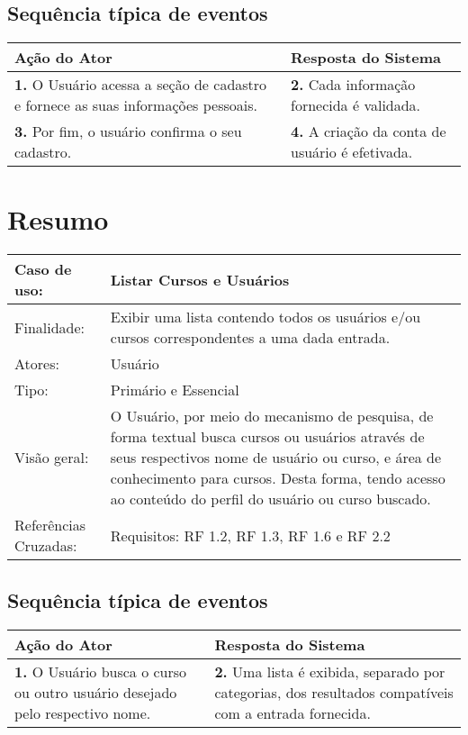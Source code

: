 \documentclass[12pt,a4paper,onecolumn,titlepage]{article}
\begin{document}
\subsection{Sequência típica de eventos}
\begin{center}
\def\arraystretch{1.1}
\begin{tabular}{|p{6cm}|p{6cm}|}

\hline
\textbf{Ação do Ator} & \textbf{Resposta do Sistema} \\ \hline
\textbf{1.} O Usuário acessa a seção de cadastro e fornece as suas informações pessoais. & \textbf{2.} Cada informação fornecida é validada. \\ \hline
\textbf{3.} Por fim, o usuário confirma o seu cadastro. & \textbf{4.} A criação da conta de usuário é efetivada. \\ \hline
\end{tabular}
\end{center}


\newpage

\section{Resumo}
\begin{table}[h!]
\begin{center}
\begin{tabular}{p{2.5cm} p{9.5cm}}
Caso de uso: & \textbf{Listar Cursos e Usuários} \\ \hline
Finalidade: & Exibir uma lista contendo todos os usuários e/ou cursos correspondentes a uma dada entrada.\\ \hline
Atores: & Usuário \\ \hline
Tipo: & Primário e Essencial\\ \hline
Visão geral: & O Usuário, por meio do mecanismo de pesquisa, de forma textual busca cursos ou usuários através de seus respectivos nome de usuário ou curso, e área de conhecimento para cursos. Desta forma, tendo acesso ao conteúdo do perfil do usuário ou curso buscado.\\ \hline
Referências Cruzadas: & Requisitos: RF 1.2, RF 1.3, RF 1.6 e RF 2.2

\end{tabular}
\end{center}
\end{table}

\subsection{Sequência típica de eventos}
\begin{center}
\def\arraystretch{1.1}
\begin{tabular}{|p{6cm}|p{6cm}|}

\hline
\textbf{Ação do Ator} & \textbf{Resposta do Sistema} \\ \hline
\textbf{1.} O Usuário busca o curso ou outro usuário desejado pelo respectivo nome. & \textbf{2.} Uma lista é exibida, separado por categorias, dos resultados compatíveis com a entrada fornecida. \\ \hline
\end{tabular}
\end{center}
\end{document}
